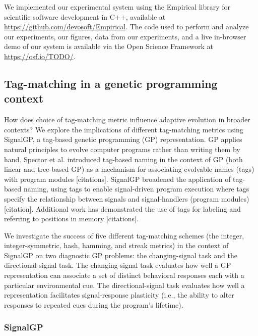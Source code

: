 We implemented our experimental system using the Empirical library for scientific software development in C++, available at \url{https://github.com/devosoft/Empirical}.
The code used to perform and analyze our experiments, our figures, data from our experiments, and a live in-browser demo of our system is available via the Open Science Framework at \url{https://osf.io/TODO/}.

\subsection{Tag-matching in a genetic programming context}

How does choice of tag-matching metric influence adaptive evolution in broader contexts?
We explore the implications of different tag-matching metrics using SignalGP, a tag-based genetic programming (GP) representation.
GP applies natural principles to evolve computer programs rather than writing them by hand.
Spector et al. introduced tag-based naming in the context of GP (both linear and tree-based GP) as a mechanism for associating evolvable names (tags) with program modules [citations].
SignalGP broadened the application of tag-based naming, using tags to enable signal-driven program execution where tags specify the relationship between signals and signal-handlers (program modules) [citation].
Additional work has demonstrated the use of tags for labeling and referring to positions in memory [citations].

We investigate the success of five different tag-matching schemes (the integer, integer-symmetric, hash, hamming, and streak metrics) in the context of SignalGP on two diagnostic GP problems: the changing-signal
task and the directional-signal task.
The changing-signal task evaluates how well a GP representation can associate a set of distinct behavioral responses each with a particular environmental cue.
The directional-signal task evaluates how well a representation facilitates signal-response plasticity (i.e., the ability to alter responses to repeated cues during the program's lifetime).

\subsubsection{SignalGP}

